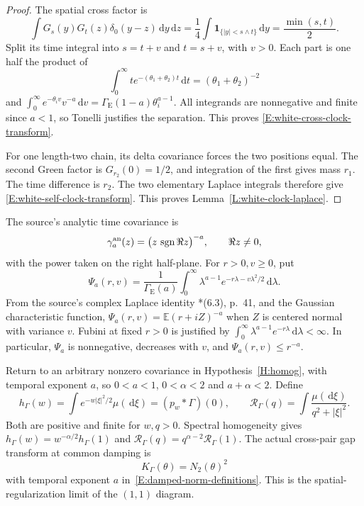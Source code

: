 \documentclass[12pt]{article}
\numberwithin{equation}{section}
\theoremstyle{definition}
\newcommand{\E}{\mathbb{E}}
\newcommand{\ud}{\,\mathrm{d}}
\begin{document}
\begin{proof}
  The spatial cross factor is
  \[
    \int G_s(y)G_t(z)\delta_0(y-z)\ud y\ud z
    =\frac14\int\mathbf1_{\{|y|<s\wedge t\}}\ud y
    =\frac{\min(s,t)}2.
  \]
  Split its time integral into \(s=t+v\) and \(t=s+v\), with \(v>0\).
  Each part is one half the product of
  \[
    \int_0^\infty t e^{-(\theta_1+\theta_2)t}\ud t
    =(\theta_1+\theta_2)^{-2}
  \]
  and
  \(\int_0^\infty e^{-\theta_i v}v^{-a}\ud v
  =\Gamma_{\mathrm E}(1-a)\theta_i^{a-1}\).
  All integrands are nonnegative and finite since \(a<1\), so Tonelli
  justifies the separation. This proves
  \eqref{E:white-cross-clock-transform}.

  For one length-two chain, its delta covariance forces the two positions
  equal. The second Green factor is \(G_{r_2}(0)=1/2\), and integration
  of the first gives mass \(r_1\). The time difference is \(r_2\).
  The two elementary Laplace integrals therefore give
  \eqref{E:white-self-clock-transform}.
  This proves Lemma~\ref{L:white-clock-laplace}.
\end{proof}

The source's analytic time covariance is
\[
  \gamma_a^{\rm an}(z)
  =\big(z\,\operatorname{sgn}\Re z\big)^{-a},\qquad \Re z\ne0,
\]
with the power taken on the right half-plane. For \(r>0,v\ge0\), put
\begin{equation}\label{E:averaged-clock-kernel}
  \Psi_a(r,v)=\frac1{\Gamma_{\mathrm E}(a)}
  \int_0^\infty \lambda^{a-1}e^{-r\lambda-v\lambda^2/2}\ud\lambda.
\end{equation}
From the source's complex Laplace identity
\cite{chen:author2026:time-dependency}*{(6.3), p.~41},
and the Gaussian characteristic function,
\(\Psi_a(r,v)=\E(r+iZ)^{-a}\) when \(Z\) is centered normal with variance \(v\).
Fubini at fixed \(r>0\) is justified by
\(\int_0^\infty\lambda^{a-1}e^{-r\lambda}\ud\lambda<\infty\).
In particular, \(\Psi_a\) is nonnegative, decreases with \(v\), and
\(\Psi_a(r,v)\le r^{-a}\).

Return to an arbitrary nonzero covariance in Hypothesis~\ref{H:homog},
with temporal exponent \(a\), so \(0<a<1\), \(0<\alpha<2\) and
\(a+\alpha<2\). Define
\[
  h_\Gamma(w)=\int e^{-w|\xi|^2/2}\mu(\ud\xi)
  =(p_w*\Gamma)(0),\qquad
  \mathcal R_\Gamma(q)=\int\frac{\mu(\ud\xi)}{q^2+|\xi|^2}.
\]
Both are positive and finite for \(w,q>0\).
Spectral homogeneity gives \(h_\Gamma(w)=w^{-\alpha/2}h_\Gamma(1)\) and
\(\mathcal R_\Gamma(q)=q^{\alpha-2}\mathcal R_\Gamma(1)\).
The actual cross-pair gap transform at common damping is
\[
  K_\Gamma(\theta)=N_2(\theta)^2
\]
with temporal exponent \(a\) in~\eqref{E:damped-norm-definitions}.
This is the spatial-regularization limit of the \((1,1)\) diagram.
\end{document}
